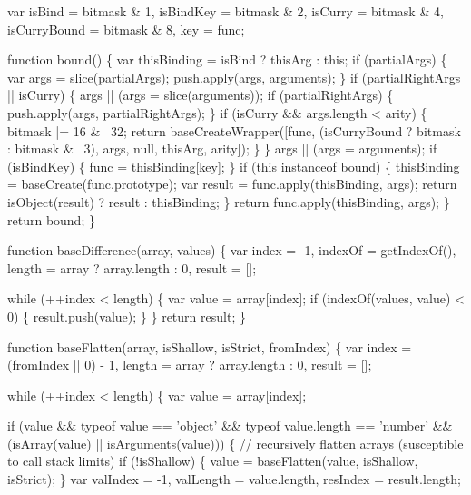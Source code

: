 \begin{DoxyCodeInclude}
{{    var isBind = bitmask & 1,
        isBindKey = bitmask & 2,
        isCurry = bitmask & 4,
        isCurryBound = bitmask & 8,
        key = func;

    \textcolor{keyword}{function} bound() \{
      var thisBinding = isBind ? thisArg : \textcolor{keyword}{this};
      \textcolor{keywordflow}{if} (partialArgs) \{
        var args = slice(partialArgs);
        push.apply(args, arguments);
      \}
      \textcolor{keywordflow}{if} (partialRightArgs || isCurry) \{
        args || (args = slice(arguments));
        \textcolor{keywordflow}{if} (partialRightArgs) \{
          push.apply(args, partialRightArgs);
        \}
        \textcolor{keywordflow}{if} (isCurry && args.length < arity) \{
          bitmask |= 16 & ~32;
          \textcolor{keywordflow}{return} baseCreateWrapper([func, (isCurryBound ? bitmask : bitmask & ~3), args, null, thisArg, 
      arity]);
        \}
      \}
      args || (args = arguments);
      \textcolor{keywordflow}{if} (isBindKey) \{
        func = thisBinding[key];
      \}
      \textcolor{keywordflow}{if} (\textcolor{keyword}{this} instanceof bound) \{
        thisBinding = baseCreate(func.prototype);
        var result = func.apply(thisBinding, args);
        \textcolor{keywordflow}{return} isObject(result) ? result : thisBinding;
      \}
      \textcolor{keywordflow}{return} func.apply(thisBinding, args);
    \}
    \textcolor{keywordflow}{return} bound;
  \}

  \textcolor{keyword}{function} baseDifference(array, values) \{
    var index = -1,
        indexOf = getIndexOf(),
        length = array ? array.length : 0,
        result = [];

    \textcolor{keywordflow}{while} (++index < length) \{
      var value = array[index];
      \textcolor{keywordflow}{if} (indexOf(values, value) < 0) \{
        result.push(value);
      \}
    \}
    \textcolor{keywordflow}{return} result;
  \}

  \textcolor{keyword}{function} baseFlatten(array, isShallow, isStrict, fromIndex) \{
    var index = (fromIndex || 0) - 1,
        length = array ? array.length : 0,
        result = [];

    while (++index < length) \{
      var value = array[index];

      \textcolor{keywordflow}{if} (value && typeof value == \textcolor{stringliteral}{'object'} && typeof value.length == \textcolor{stringliteral}{'number'}
          && (isArray(value) || isArguments(value))) \{
        \textcolor{comment}{// recursively flatten arrays (susceptible to call stack limits)}
        \textcolor{keywordflow}{if} (!isShallow) \{
          value = baseFlatten(value, isShallow, isStrict);
        \}
        var valIndex = -1,
            valLength = value.length,
            resIndex = result.length;

}}
\end{DoxyCodeInclude}
